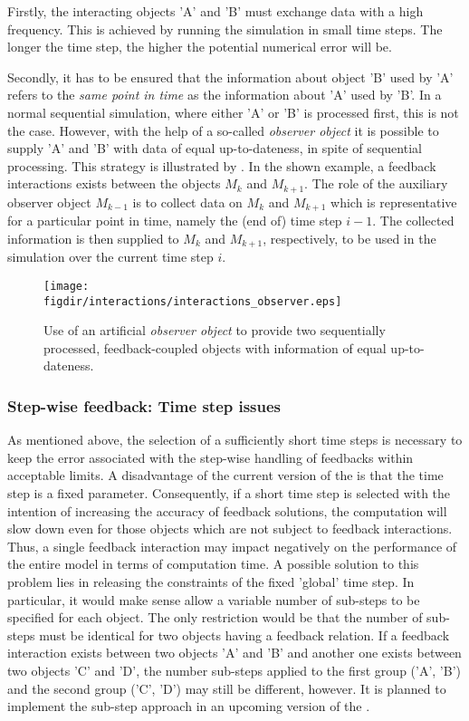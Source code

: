 Firstly, the interacting objects 'A' and 'B' must exchange data with a high frequency. This is achieved by running the simulation in small time steps. The longer the time step, the higher the potential numerical error will be.

Secondly, it has to be ensured that the information about object 'B' used by 'A' refers to the \emph{same point in time} as the information about 'A' used by 'B'. In a normal sequential simulation, where either 'A' or 'B' is processed first, this is not the case. However, with the help of a so-called \emph{observer object} it is possible to supply 'A' and 'B' with data of equal up-to-dateness, in spite of sequential processing. This strategy is illustrated by . In the shown example, a feedback interactions exists between the objects $M_k$ and $M_{k+1}$. The role of the auxiliary observer object $M_{k-1}$ is to collect data on $M_k$ and $M_{k+1}$ which is representative for a particular point in time, namely the (end of) time step $i-1$. The collected information is then supplied to $M_k$ and $M_{k+1}$, respectively, to be used in the simulation over the current time step $i$.

\begin{figure}
  \centering
  \texttt{[image: \\figdir/interactions/interactions\_observer.eps]}
  \caption{Use of an artificial \emph{observer object} to provide two sequentially processed, feedback-coupled objects with information of equal up-to-dateness. \label{fig:concept-interactions-observer}}
\end{figure}

\subsubsection*{Step-wise feedback: Time step issues}

As mentioned above, the selection of a sufficiently short time steps is necessary to keep the error associated with the step-wise handling of feedbacks within acceptable limits. A disadvantage of the current version of the  is that the time step is a fixed parameter. Consequently, if a short time step is selected with the intention of increasing the accuracy of feedback solutions, the computation will slow down even for those objects which are not subject to feedback interactions. Thus, a single feedback interaction may impact negatively on the performance of the entire model in terms of computation time. A possible solution to this problem lies in releasing the constraints of the fixed 'global' time step. In particular, it would make sense allow a variable number of sub-steps to be specified for each object. The only restriction would be that the number of sub-steps must be identical for two objects having a feedback relation. If a feedback interaction exists between two objects 'A' and 'B' and another one exists between two objects 'C' and 'D', the number sub-steps applied to the first group ('A', 'B') and the second group ('C', 'D') may still be different, however. It is planned to implement the sub-step approach in an upcoming version of the .

